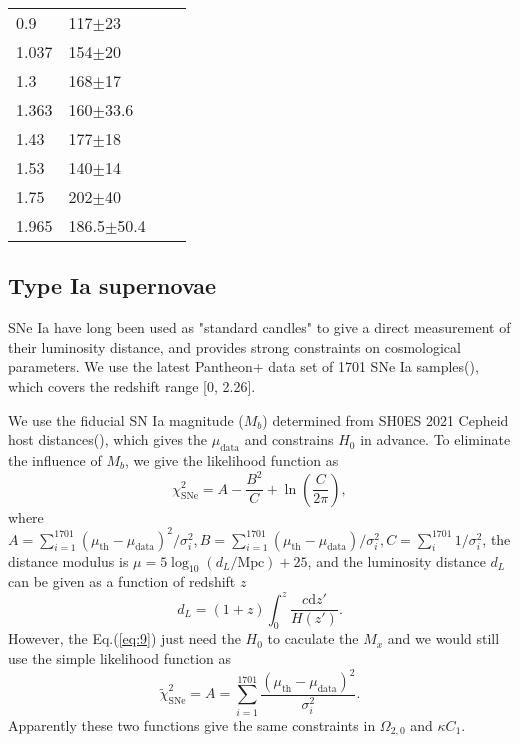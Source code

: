 \documentclass{aa}
\begin{document}
\begin{table}[htbp]
\begin{tabular}{llll}
         0.9 & 117$\pm$23 & \cite{PhysRevD.71.123001} \\
         1.037 & 154$\pm$20 & \cite{M.Moresco_2012} \\
         1.3 & 168$\pm$17 & \cite{PhysRevD.71.123001} \\
         1.363 & 160$\pm$33.6 & \cite{10.1093/mnrasl/slv037} \\
         1.43 & 177$\pm$18 & \cite{PhysRevD.71.123001} \\
         1.53 & 140$\pm$14 & \cite{PhysRevD.71.123001} \\
         1.75 & 202$\pm$40 & \cite{PhysRevD.71.123001} \\
         1.965 & 186.5$\pm$50.4 & \cite{10.1093/mnrasl/slv037} \\
         \hline    
      \end{tabular}
      \label{tab:1}
   \end{table}

\subsection{Type Ia supernovae}

   SNe Ia have long been used as "standard candles" to give a direct
   measurement of their luminosity distance, and provides strong constraints
   on cosmological parameters. We use the latest Pantheon+ data set of 1701 
   SNe Ia samples(\cite{Scolnic_2022}), which covers the redshift range [0, 2.26].
   
   We use the fiducial SN Ia magnitude ($M_b$) determined from SH0ES 2021 Cepheid 
   host distances(\cite{Riess_2022}), which gives the $\mu_\text{data}$ and constrains $H_0$
   in advance. To eliminate the influence of $M_b$, we give the likelihood function
   as \begin{equation}
      \chi_{\text{SNe}}^2=A-\frac{B^2}{C}+\ln\left(\frac{C}{2\pi}\right),
   \end{equation}
   where $A=\sum_{i=1}^{1701}(\mu_{\text{th}}-\mu_{\text{data}})^2/\sigma_i^2,
   B=\sum_{i=1}^{1701}(\mu_{\text{th}}-\mu_{\text{data}})/\sigma_i^2,C=\sum_i^{1701}1/\sigma_i^2$,
   the distance modulus is $\mu=5\log_{10}(d_L/\text{Mpc})+25$, and the
   luminosity distance $d_L$ can be given as a function of redshift $z$
   \begin{equation}
      d_L=(1+z)\int_0^z\frac{c\mathrm{d}z'}{H(z')}.
   \end{equation}
   However, the Eq.(\ref{eq:9}) just need the $H_0$ to caculate the $M_x$
   and we would still use the simple likelihood function as
   \begin{equation}
      \tilde{\chi}_{\text{SNe}}^2=A=\sum_{i=1}^{1701}\frac{(\mu_{\text{th}}-\mu_{\text{data}})^2}{\sigma_i^2}.
   \end{equation}
   Apparently these two functions give the same constraints in $\Omega_{2,0}$
   and $\kappa C_1$.
\end{document}
